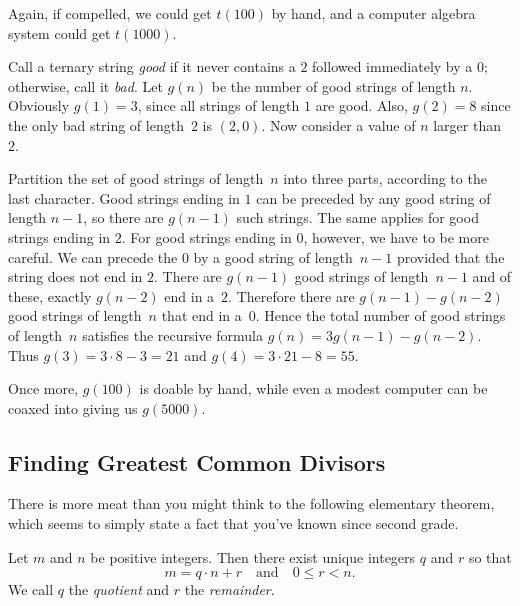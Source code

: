 Again, if compelled, we could get $t(100)$ by hand, and a computer
algebra system could get $t(1000)$.

\begin{example}
  Call a ternary string \textit{good} if it never contains a $2$
  followed immediately by a $0$; otherwise, call it \textit{bad}. Let
  $g(n)$ be the number of good strings of length $n$. Obviously
  $g(1)=3$, since all strings of length $1$ are good.  Also, $g(2)=8$
  since the only bad string of length~$2$ is $(2,0)$.  Now consider a
  value of $n$ larger than~$2$.

  Partition the set of good strings of length~$n$ into three parts,
  according to the last character. Good strings ending in $1$ can be
  preceded by any good string of length $n-1$, so there are $g(n-1)$
  such strings. The same applies for good strings ending in $2$. For
  good strings ending in $0$, however, we have to be more careful. We
  can precede the $0$ by a good string of length~$n-1$ provided that
  the string does not end in $2$. There are $g(n-1)$ good strings of
  length~$n-1$ and of these, exactly $g(n-2)$ end in a~$2$.  Therefore
  there are $g(n-1)-g(n-2)$ good strings of length~$n$ that end in
  a~$0$.  Hence the total number of good strings of length~$n$
  satisfies the recursive formula $g(n) = 3g(n-1) - g(n-2)$.  Thus
  $g(3) = 3\cdot8 -3= 21$ and $g(4)= 3\cdot21-8= 55$.
\end{example}

Once more, $g(100)$ is doable by hand, while even a modest computer can be
coaxed into giving us $g(5000)$.

\subsection{Finding Greatest Common Divisors}\label{s:induction:gcd}

There is more meat than you might think to the following elementary
theorem, which seems to simply state a fact that you've known since
second grade.

\begin{theorem}\label{thm:division}
Let $m$ and $n$ be positive integers.  Then there exist
unique integers $q$ and $r$ so that
\[
m = q\cdot n+r\quad\text{and}\quad 0 \le r < n.
\]
We call $q$ the \emph{quotient} and $r$ the \emph{remainder}.
\end{theorem}

